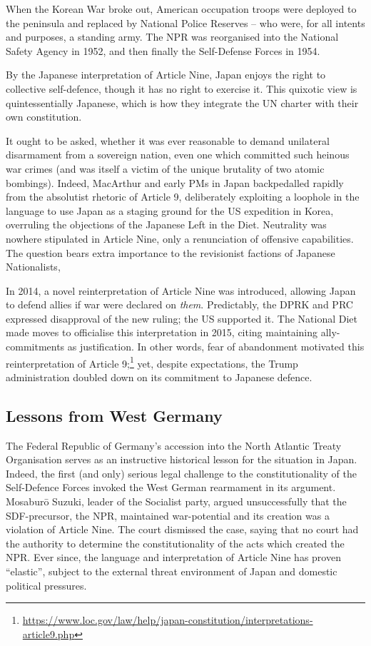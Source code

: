 \documentclass[letterpaper,12pt,twoside]{article} %
\begin{document}
\begin{multicols}{2}
When the Korean War broke out, American occupation troops were deployed to the peninsula and replaced by National Police Reserves -- who were, for all intents and purposes, a standing army. The NPR was reorganised into the National Safety Agency in 1952, and then finally the Self-Defense Forces in 1954.

By the Japanese interpretation of Article Nine, Japan enjoys the right to collective self-defence, though it has no right to exercise it.\autocite[127]{izumikawa2010antimilitarism} This quixotic view is quintessentially Japanese, which is how they integrate the UN charter with their own constitution.

It ought to be asked, whether it was ever reasonable to demand unilateral disarmament from a sovereign nation, even one which committed such heinous war crimes (and was itself a victim of the unique brutality of two atomic bombings). Indeed, MacArthur and early PMs in Japan backpedalled rapidly from the absolutist rhetoric of Article 9, deliberately exploiting a loophole in the language to use Japan as a staging ground for the US expedition in Korea, overruling the objections of the Japanese Left in the Diet.\autocite[55]{sissons1961pacifist} Neutrality was nowhere stipulated in Article Nine, only a renunciation of offensive capabilities. The question bears extra importance to the revisionist factions of Japanese Nationalists,

In 2014, a novel reinterpretation of Article Nine was introduced, allowing Japan to defend allies if war were declared on \textit{them}. Predictably, the DPRK and PRC expressed disapproval of the new ruling; the US supported it. The National Diet made moves to officialise this interpretation in 2015, citing maintaining ally-commitments as justification. In other words, fear of abandonment motivated this reinterpretation of Article 9;\footnote{\url{https://www.loc.gov/law/help/japan-constitution/interpretations-article9.php}} yet, despite expectations, the Trump administration doubled down on its commitment to Japanese defence.\autocite[242]{lind2018trump}

\subsection{Lessons from West Germany}

The Federal Republic of Germany's accession into the North Atlantic Treaty Organisation serves as an instructive historical lesson for the situation in Japan. Indeed, the first (and only) serious legal challenge to the constitutionality of the Self-Defence Forces invoked the West German rearmament in its argument.  Mosaburō Suzuki, leader of the Socialist party, argued unsuccessfully that the SDF-precursor, the NPR, maintained war-potential and its creation was a violation of Article Nine. The court dismissed the case, saying that no court had the authority to determine the constitutionality of the acts which created the NPR.\autocite[56]{sissons1961pacifist} Ever since, the language and interpretation of Article Nine has proven ``elastic'', subject to the external threat environment of Japan and domestic political pressures.


\end{multicols}
\end{document}
